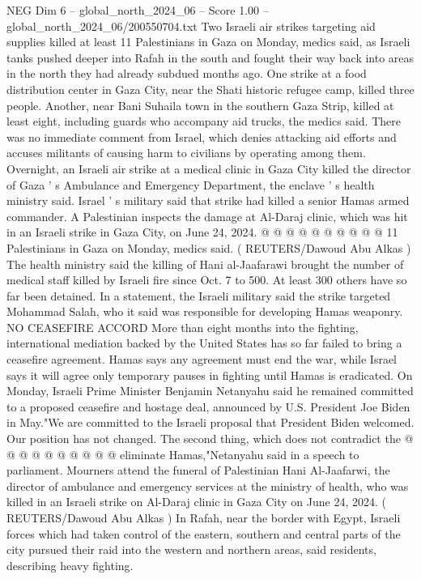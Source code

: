 \begin{textsample}{NEG Dim 6 – global\_north\_2024\_06 – Score 1.00 – global\_north\_2024\_06/200550704.txt}  \label{ex:f6_neg_308}
Two Israeli air strikes targeting aid supplies killed at least 11 Palestinians in Gaza on Monday, medics said, as Israeli tanks pushed deeper into Rafah in the south and fought their way back into areas in the north they had already subdued months ago.
One strike at a food distribution center in Gaza City, near the Shati historic refugee camp, killed three people.
Another, near Bani Suhaila town in the southern Gaza Strip, killed at least eight, including guards who accompany aid trucks, the medics said.
There was no immediate comment from Israel, which denies attacking aid efforts and accuses militants of causing harm to civilians by operating among them.
Overnight, an Israeli air strike at a medical clinic in Gaza City killed the director of Gaza ' s Ambulance and Emergency Department, the enclave ' s health ministry said.
Israel ' s military said that strike had killed a senior Hamas armed commander.
A Palestinian inspects the damage at Al-Daraj clinic, which was hit in an Israeli strike in Gaza City, on June 24, 2024. @ @ @ @ @ @ @ @ @ @ 11 Palestinians in Gaza on Monday, medics said. ( REUTERS/Dawoud Abu Alkas ) The health ministry said the killing of Hani al-Jaafarawi brought the number of medical staff killed by Israeli fire since Oct. 7 to 500.
At least 300 others have so far been detained.
In a statement, the Israeli military said the strike targeted Mohammad Salah, who it said was responsible for developing Hamas weaponry.
NO CEASEFIRE ACCORD More than eight months into the fighting, international mediation backed by the United States has so far failed to bring a ceasefire agreement.
Hamas says any agreement must end the war, while Israel says it will agree only temporary pauses in fighting until Hamas is eradicated.
On Monday, Israeli Prime Minister Benjamin Netanyahu said he remained committed to a proposed ceasefire and hostage deal, announced by U.S.
President Joe Biden in May."We are committed to the Israeli proposal that President Biden welcomed.
Our position has not changed.
The second thing, which does not contradict the @ @ @ @ @ @ @ @ @ @ eliminate Hamas,"Netanyahu said in a speech to parliament.
Mourners attend the funeral of Palestinian Hani Al-Jaafarwi, the director of ambulance and emergency services at the ministry of health, who was killed in an Israeli strike on Al-Daraj clinic in Gaza City on June 24, 2024. ( REUTERS/Dawoud Abu Alkas ) In Rafah, near the border with Egypt, Israeli forces which had taken control of the eastern, southern and central parts of the city pursued their raid into the western and northern areas, said residents, describing heavy fighting.

\end{textsample}
